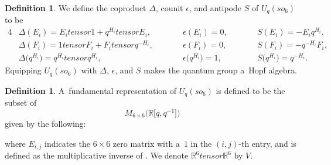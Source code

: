 \documentclass[10pt,a4paper]{amsart}
\numberwithin{equation}{section}
\theoremstyle{definition}
\newtheorem{Definition}[Theorem]{Definition}
\def\mathcal#1{#1}
\def\mathfrak#1{#1}
\def\otimes{ tensor }
\begin{document}
\begin{Definition} \label{definition--coproduct}
 We define the coproduct $\Delta$, counit $\epsilon$, and antipode $S$ of $\mathcal{U}_q(\mathfrak{so}_6)$ to be
 \begin{alignat*}{4}
 &\Delta (E_i) = E_i \otimes 1 + q^{H_i} \otimes E_i, \qquad &&\epsilon(E_i) = 0, \qquad&& S(E_i) = -E_iq^{H_i},& \\
 &\Delta(F_i) = 1 \otimes F_i + F_i \otimes q^{-H_i}, \qquad&& \epsilon(F_i) = 0,\qquad&& S(F_i) = -q^{-H_i}F_i,& \\
 &\Delta\bigl(q^{H_i}\bigr) = q^{H_i} \otimes q^{H_i},\qquad&& \epsilon\bigl(q^{H_i}\bigr) = 1,\qquad&&
 S\bigl(q^{H_i}\bigr) = q^{-H_i}.&
 \end{alignat*}
 Equipping $\mathcal{U}_q(\mathfrak{so}_6)$ with $\Delta$, $\epsilon$, and $S$ makes the quantum group a~Hopf algebra.
\end{Definition}

\begin{Definition} \label{definition-fundrep}
 A~fundamental representation of $\mathcal{U}_q(\mathfrak{so}_6)$ is defined to be the subset of
 \[M_{6 \times 6}\bigl(\mathbb{R}\bigl[q, q^{-1}\bigr]\bigr)\]
 given by the following:\vspace{-2mm}

\begin{center} \renewcommand{\arraystretch}{1.2}
 \end{center}

\noindent
where $E_{i,j}$ indicates the $6\times 6$ zero matrix with a~$1$ in the $(i,j)$-th entry, and  is defined as the multiplicative inverse of . We denote $\mathbb{R}^6 \otimes \mathbb{R}^6$ by $V$.
\end{Definition}
\end{document}
